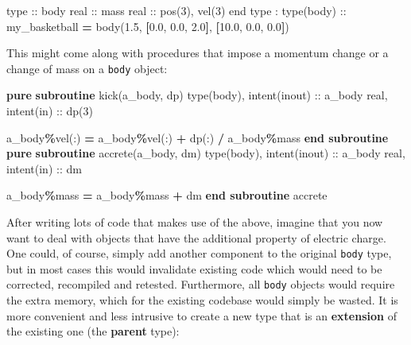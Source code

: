 \documentclass[
  paper=a4,
  ,captions=tableheading
]{scrartcl}
\newenvironment{Shaded}{\begin{snugshade}}{\end{snugshade}}
\newcommand{\DataTypeTok}[1]{\textcolor[rgb]{0.13,0.29,0.53}{#1}}
\newcommand{\DecValTok}[1]{\textcolor[rgb]{0.00,0.00,0.81}{#1}}
\newcommand{\FloatTok}[1]{\textcolor[rgb]{0.00,0.00,0.81}{#1}}
\newcommand{\KeywordTok}[1]{\textcolor[rgb]{0.13,0.29,0.53}{\textbf{#1}}}
\newcommand{\NormalTok}[1]{#1}
\newcommand{\OperatorTok}[1]{\textcolor[rgb]{0.81,0.36,0.00}{\textbf{#1}}}
\begin{document}
\begin{Shaded}
\begin{Highlighting}[]
\DataTypeTok{type} \DataTypeTok{::}\NormalTok{ body}
  \DataTypeTok{real} \DataTypeTok{::}\NormalTok{ mass}
  \DataTypeTok{real} \DataTypeTok{::}\NormalTok{ pos(}\DecValTok{3}\NormalTok{), vel(}\DecValTok{3}\NormalTok{)}
\DataTypeTok{end type}
\NormalTok{:}
\DataTypeTok{type(body)} \DataTypeTok{::}\NormalTok{ my\_basketball }\KeywordTok{=}\NormalTok{ body(}\FloatTok{1.5}\NormalTok{, }\KeywordTok{[}\FloatTok{0.0}\NormalTok{, }\FloatTok{0.0}\NormalTok{, }\FloatTok{2.0}\KeywordTok{]}\NormalTok{, }\KeywordTok{[}\FloatTok{10.0}\NormalTok{, }\FloatTok{0.0}\NormalTok{, }\FloatTok{0.0}\KeywordTok{]}\NormalTok{)}
\end{Highlighting}
\end{Shaded}

This might come along with procedures that impose a momentum change or a
change of mass on a \texttt{body} object:

\begin{Shaded}
\begin{Highlighting}[]
\KeywordTok{pure} \KeywordTok{subroutine}\NormalTok{ kick(a\_body, dp)}
  \DataTypeTok{type(body)}\NormalTok{, }\DataTypeTok{intent(inout)} \DataTypeTok{::}\NormalTok{ a\_body}
  \DataTypeTok{real}\NormalTok{, }\DataTypeTok{intent(in)} \DataTypeTok{::}\NormalTok{ dp(}\DecValTok{3}\NormalTok{)}

\NormalTok{  a\_body}\OperatorTok{\%}\NormalTok{vel(:) }\KeywordTok{=}\NormalTok{ a\_body}\OperatorTok{\%}\NormalTok{vel(:) }\KeywordTok{+}\NormalTok{ dp(:) }\KeywordTok{/}\NormalTok{ a\_body}\OperatorTok{\%}\NormalTok{mass}
\KeywordTok{end subroutine}
\KeywordTok{pure} \KeywordTok{subroutine}\NormalTok{ accrete(a\_body, dm)}
  \DataTypeTok{type(body)}\NormalTok{, }\DataTypeTok{intent(inout)} \DataTypeTok{::}\NormalTok{ a\_body}
  \DataTypeTok{real}\NormalTok{, }\DataTypeTok{intent(in)} \DataTypeTok{::}\NormalTok{ dm}

\NormalTok{  a\_body}\OperatorTok{\%}\NormalTok{mass }\KeywordTok{=}\NormalTok{ a\_body}\OperatorTok{\%}\NormalTok{mass }\KeywordTok{+}\NormalTok{ dm}
\KeywordTok{end subroutine}\NormalTok{ accrete}
\end{Highlighting}
\end{Shaded}

After writing lots of code that makes use of the above, imagine that you
now want to deal with objects that have the additional property of
electric charge. One could, of course, simply add another component to
the original \texttt{body} type, but in most cases this would invalidate
existing code which would need to be corrected, recompiled and retested.
Furthermore, all \texttt{body} objects would require the extra memory,
which for the existing codebase would simply be wasted. It is more
convenient and less intrusive to create a new type that is an
\textbf{extension} of the existing one (the \textbf{parent} type):
\end{document}
